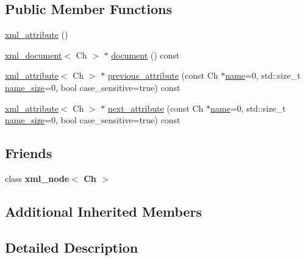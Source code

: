 \subsection*{Public Member Functions}
\begin{DoxyCompactItemize}
\item 
\hyperlink{classrapidxml_1_1xml__attribute_a26be291103917d3e8de110d46dd83816}{xml\+\_\+attribute} ()
\item 
\hyperlink{classrapidxml_1_1xml__document}{xml\+\_\+document}$<$ Ch $>$ $\ast$ \hyperlink{classrapidxml_1_1xml__attribute_ab0ff3bc7880a6969ddcf0bb1e0444077}{document} () const
\item 
\hyperlink{classrapidxml_1_1xml__attribute}{xml\+\_\+attribute}$<$ Ch $>$ $\ast$ \hyperlink{classrapidxml_1_1xml__attribute_abb0fb881f7247aefaec4b65b5eabc7ee}{previous\+\_\+attribute} (const Ch $\ast$\hyperlink{classrapidxml_1_1xml__base_aef8ae147fbee59209f714274afc80dc4}{name}=0, std\+::size\+\_\+t \hyperlink{classrapidxml_1_1xml__base_a20c8ffbe0c7a0b4231681ab8b99330a4}{name\+\_\+size}=0, bool case\+\_\+sensitive=true) const
\item 
\hyperlink{classrapidxml_1_1xml__attribute}{xml\+\_\+attribute}$<$ Ch $>$ $\ast$ \hyperlink{classrapidxml_1_1xml__attribute_affd0c8d0a9020df0998c507cae5474e5}{next\+\_\+attribute} (const Ch $\ast$\hyperlink{classrapidxml_1_1xml__base_aef8ae147fbee59209f714274afc80dc4}{name}=0, std\+::size\+\_\+t \hyperlink{classrapidxml_1_1xml__base_a20c8ffbe0c7a0b4231681ab8b99330a4}{name\+\_\+size}=0, bool case\+\_\+sensitive=true) const
\end{DoxyCompactItemize}
\subsection*{Friends}
\begin{DoxyCompactItemize}
\item 
\mbox{\label{classrapidxml_1_1xml__attribute_aa7e464ce3fe512598ff8dda47291941f}} 
class {\bfseries xml\+\_\+node$<$ Ch $>$}
\end{DoxyCompactItemize}
\subsection*{Additional Inherited Members}


\subsection{Detailed Description}
